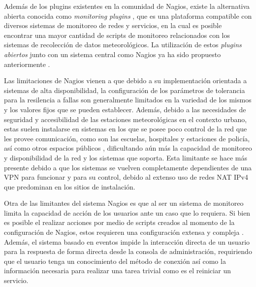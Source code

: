 Además de los plugins existentes en la comunidad de Nagios, existe la alternativa abierta conocida como \textit{monitoring plugins} \cite{monitoring_plugins}, que es una plataforma compatible con diversos sistemas de monitoreo de redes y servicios, en la cual es posible encontrar una mayor cantidad de scripts de monitoreo relacionados con los sistemas de recolección de datos meteorológicos. La utilización de estos \textit{plugins abiertos} junto con un sistema central como Nagios ya ha sido propuesto anteriormente \cite{monitoreo_raspberry_nagios}.

Las limitaciones de Nagios vienen a que debido a su implementación orientada a sistemas de alta disponibilidad, la configuración de los parámetros de tolerancia para la resilencia a fallas son generalmente limitados en la variedad de los mismos y los valores fijos que se pueden establecer. Además, debido a las necesidades de seguridad y accesibilidad de las estaciones meteorológicas en el contexto urbano, estas suelen instalarse en sistemas en los que se posee poco control de la red que les provee comunicación, como son las escuelas, hospitales y estaciones de policía, así como otros espacios públicos \cite{muller_sensors_and_the_city}, dificultando aún más la capacidad de monitoreo y disponibilidad de la red y los sistemas que soporta. Esta limitante se hace más presente debido a que los sistemas se vuelven completamente dependientes de una VPN para funcionar y para su control, debido al extenso uso de redes NAT IPv4 que predominan en los sitios de instalación.

Otra de las limitantes del sistema Nagios es que al ser un sistema de monitoreo limita la capacidad de acción de los usuarios ante un caso que lo requiera. Si bien es posible el realizar acciones por medio de scripts creados al momento de la configuración de Nagios, estos requieren una configuración extensa y compleja \cite{nagios_service_restart}. Además, el sistema basado en eventos impide la interacción directa de un usuario para la respuesta de forma directa desde la consola de administración, requiriendo que el usuario tenga un conocimiento del método de conexión así como la información necesaria para realizar una tarea trivial como es el reiniciar un servicio.


